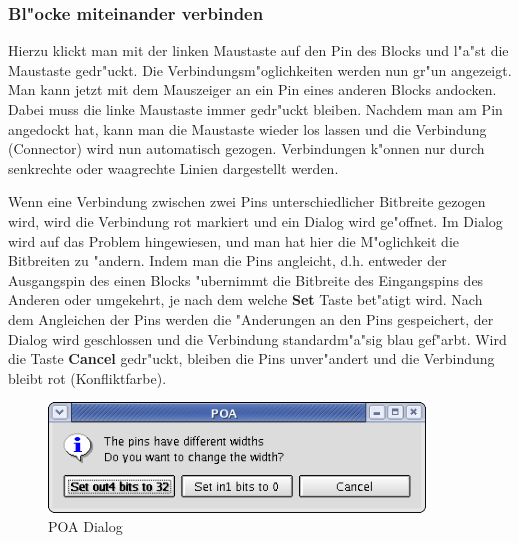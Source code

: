 \documentclass[a4paper,titlepage,12pt,ngerman]{scrbook}
\begin{document}
\subsubsection{Bl"ocke miteinander verbinden}
Hierzu klickt man mit der linken Maustaste auf den Pin des Blocks und l"a"st die Maustaste gedr"uckt. Die Verbindungsm"oglichkeiten werden nun gr"un angezeigt. Man kann jetzt mit dem Mauszeiger an ein Pin eines anderen Blocks andocken. Dabei muss die linke Maustaste immer gedr"uckt bleiben. Nachdem man am Pin angedockt hat, kann man die Maustaste wieder los lassen und die Verbindung (Connector) wird nun automatisch gezogen. Verbindungen k"onnen nur durch senkrechte oder waagrechte Linien dargestellt werden.\par
Wenn eine Verbindung zwischen zwei Pins unterschiedlicher Bitbreite gezogen wird, wird die Verbindung rot markiert und ein Dialog wird ge"offnet. Im Dialog wird auf das Problem hingewiesen, und man hat hier die M"oglichkeit die Bitbreiten zu "andern. Indem man die Pins angleicht, d.h. entweder der Ausgangspin des einen Blocks "ubernimmt die Bitbreite des Eingangspins des Anderen oder umgekehrt, je nach dem welche {\bf Set} Taste bet"atigt wird. Nach dem Angleichen der Pins werden die "Anderungen an den Pins gespeichert, der Dialog wird geschlossen und die Verbindung standardm"a"sig blau gef"arbt.\newline
Wird die Taste {\bf Cancel} gedr"uckt, bleiben die Pins unver"andert und die Verbindung bleibt rot (Konfliktfarbe).

\begin{figure}[htbp]

\begin{center}

\includegraphics[width=10cm]{Pin}

\caption{POA Dialog}\label{test}

\end{center}

\end{figure}
\end{document}
